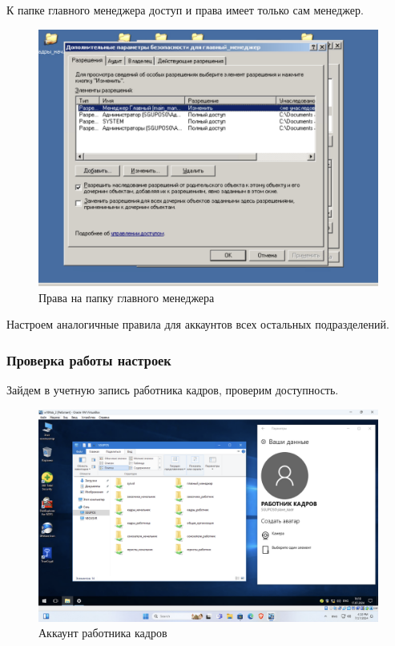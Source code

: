 \newpage
К папке главного менеджера доступ и права имеет только сам менеджер.
\begin{figure}[H]
  \centering
  \includegraphics[width=1\textwidth]{pict/prac/11}
  \caption{Права на папку главного менеджера}
  \label{fig:48}
\end{figure}
Настроем аналогичные правила для аккаунтов всех остальных подразделений.

\newpage


\subsubsection{Проверка работы настроек}

Зайдем в учетную запись работника кадров, проверим доступность.
\begin{figure}[H]
  \centering
  \includegraphics[width=1\textwidth]{pict/prac/25}
  \caption{Аккаунт работника кадров}
  \label{fig:24}
\end{figure}


